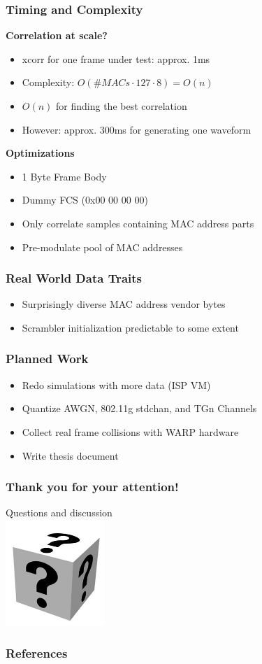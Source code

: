 \documentclass[accentcolor=tud8b,colorbacktitle]{tudbeamer}
\begin{document}
\begin{frame}
\frametitle{Timing and Complexity}
\textbf{Correlation at scale?}
\begin{itemize}
	\item xcorr for one frame under test: approx. 1ms
	\item Complexity: $O(\#MACs \cdot 127 \cdot 8) = O(n)$
	\item $O(n)$ for finding the best correlation
	\item However: approx. 300ms for generating one waveform
\end{itemize}
\vspace{0.5cm}
\textbf{Optimizations}
\begin{itemize}
	\item 1 Byte Frame Body
	\item Dummy FCS (0x00 00 00 00)
	\item Only correlate samples containing MAC address parts
	\item Pre-modulate pool of MAC addresses
\end{itemize}
\end{frame}


\begin{frame}
\frametitle{Real World Data Traits}
\begin{itemize}
	\setlength\itemsep{1em}
	\item Surprisingly diverse MAC address vendor bytes
	\item Scrambler initialization predictable to some extent \cite{noubir2016}
\end{itemize}
\end{frame}


\begin{frame}
\frametitle{Planned Work}
\begin{itemize}
	\setlength\itemsep{1em}
	\item Redo simulations with more data (ISP VM)
	\item Quantize AWGN, 802.11g stdchan, and TGn Channels
	\item Collect real frame collisions with WARP hardware
	\item Write thesis document \smiley
\end{itemize}
\end{frame}


\begin{frame}
\frametitle{Thank you for your attention!}
\begin{center}
	\huge Questions and discussion\\
	\vspace{0,6cm}
	\includegraphics[height=4cm]{assets/faq}
\end{center}
\end{frame}


\begin{frame}[allowframebreaks]
\frametitle{References}


\end{frame}
\end{document}
